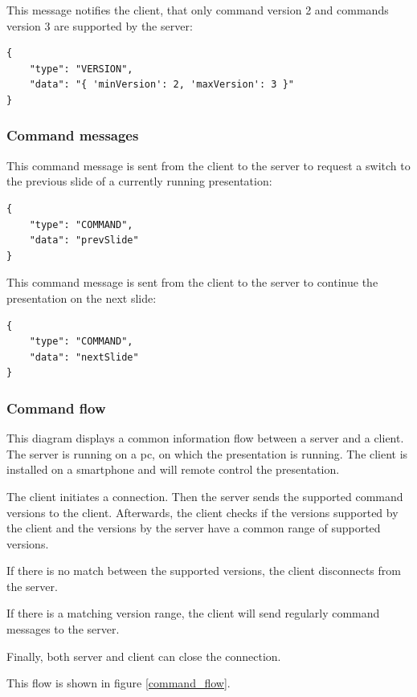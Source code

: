 \documentclass[]{article}
\begin{document}
This message notifies the client, that only command version 2 and commands version 3 are supported by the server:

\begin{verbatim}
{
    "type": "VERSION",
    "data": "{ 'minVersion': 2, 'maxVersion': 3 }"
}
\end{verbatim}

\subsubsection{Command messages}

This command message is sent from the client to the server to request a switch to the previous slide of a currently running presentation:

\begin{verbatim}
{
    "type": "COMMAND",
    "data": "prevSlide"
}
\end{verbatim}

This command message is sent from the client to the server to continue the presentation on the next slide:

\begin{verbatim}
{
    "type": "COMMAND",
    "data": "nextSlide"
}
\end{verbatim}

\subsubsection{Command flow}

This diagram displays a common information flow between a server and a client.\\
The server is running on a pc, on which the presentation is running. The client is installed on a smartphone and will remote control the presentation.

The client initiates a connection. Then the server sends the supported command versions to the client. Afterwards, the client checks if the versions supported by the client and the versions by the server have a common range of supported versions.

If there is no match between the supported versions, the client disconnects from the server.

If there is a matching version range, the client will send regularly command messages to the server.

Finally, both server and client can close the connection.

This flow is shown in figure \ref{command_flow}.
\end{document}
